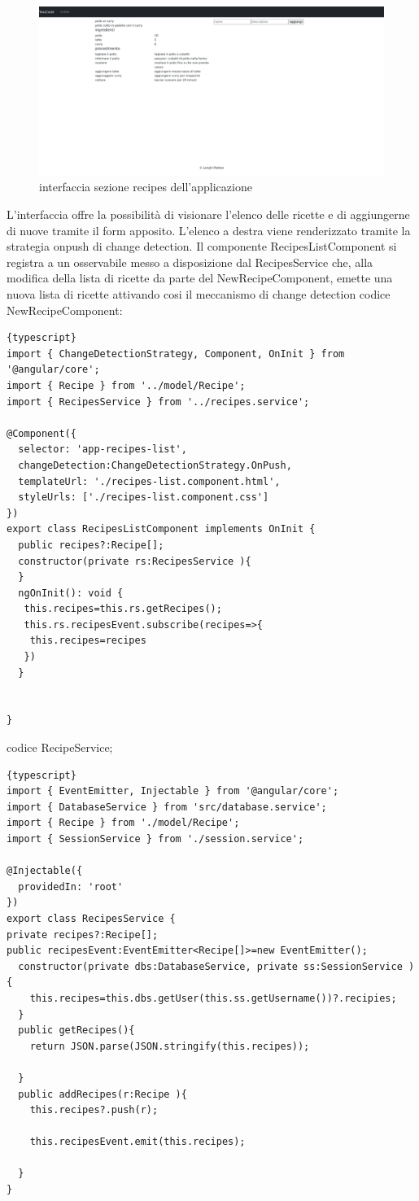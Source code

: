 \begin{figure}[H]
    \centering
 \includegraphics[scale=0.2]{resources/interfaccia-recipes.png}
   \caption{interfaccia sezione recipes dell'applicazione}
\end{figure}
L'interfaccia offre la possibilità di visionare l'elenco delle ricette e di aggiungerne di nuove tramite il form apposito.
L'elenco a destra viene renderizzato tramite la strategia onpush di change detection.
\newline
Il componente RecipesListComponent si registra a un osservabile messo a disposizione dal RecipesService che, alla modifica della lista di ricette da parte del NewRecipeComponent, emette una nuova lista di ricette attivando cosi il meccanismo di change detection
\newpage
codice NewRecipeComponent:
\begin{lstlisting}{typescript}
import { ChangeDetectionStrategy, Component, OnInit } from '@angular/core';
import { Recipe } from '../model/Recipe';
import { RecipesService } from '../recipes.service';

@Component({
  selector: 'app-recipes-list',
  changeDetection:ChangeDetectionStrategy.OnPush,
  templateUrl: './recipes-list.component.html',
  styleUrls: ['./recipes-list.component.css']
})
export class RecipesListComponent implements OnInit {
  public recipes?:Recipe[];
  constructor(private rs:RecipesService ){
  }
  ngOnInit(): void {
   this.recipes=this.rs.getRecipes();
   this.rs.recipesEvent.subscribe(recipes=>{
    this.recipes=recipes
   })
  }


}

\end{lstlisting}

\newpage
codice RecipeService;
\begin{lstlisting}{typescript}
import { EventEmitter, Injectable } from '@angular/core';
import { DatabaseService } from 'src/database.service';
import { Recipe } from './model/Recipe';
import { SessionService } from './session.service';

@Injectable({
  providedIn: 'root'
})
export class RecipesService {
private recipes?:Recipe[];
public recipesEvent:EventEmitter<Recipe[]>=new EventEmitter();
  constructor(private dbs:DatabaseService, private ss:SessionService ) {
    this.recipes=this.dbs.getUser(this.ss.getUsername())?.recipies;
  }
  public getRecipes(){
    return JSON.parse(JSON.stringify(this.recipes));

  }
  public addRecipes(r:Recipe ){
    this.recipes?.push(r);

    this.recipesEvent.emit(this.recipes);

  }
}
\end{lstlisting}
